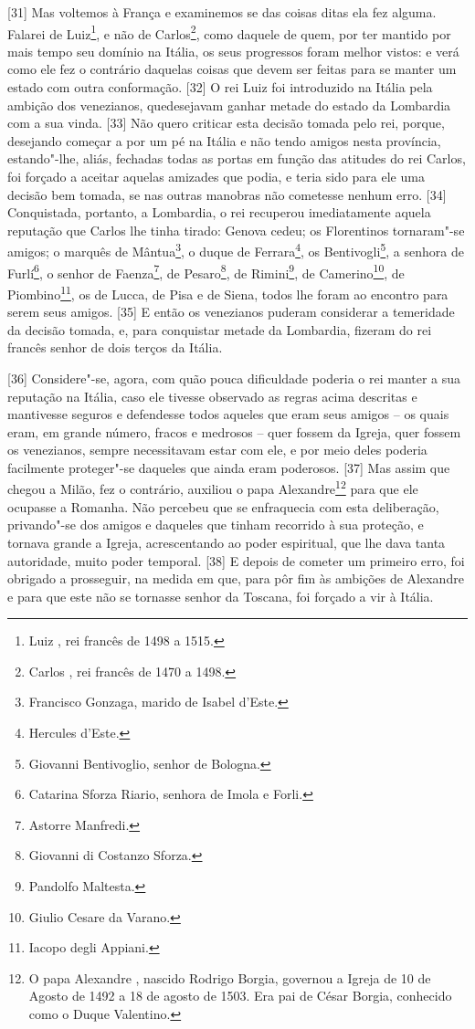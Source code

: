 {[}31{]} Mas voltemos à França e examinemos se das coisas ditas ela fez
alguma. Falarei de Luiz\footnote{Luiz , rei francês de 1498 a 1515.},
e não de Carlos\footnote{Carlos , rei francês de 1470 a 1498.}, como
daquele de quem, por ter mantido por mais tempo seu domínio na Itália,
os seus progressos foram melhor vistos: e verá como ele fez o contrário
daquelas coisas que devem ser feitas para se manter um estado com outra
conformação. {[}32{]} O rei Luiz foi introduzido na Itália pela ambição
dos venezianos, quedesejavam ganhar metade do estado da Lombardia com a
sua vinda. {[}33{]} Não quero criticar esta decisão tomada pelo rei,
porque, desejando começar a por um pé na Itália e não tendo amigos nesta
província, estando"-lhe, aliás, fechadas todas as portas em função das
atitudes do rei Carlos, foi forçado a aceitar aquelas amizades que
podia, e teria sido para ele uma decisão bem tomada, se nas outras
manobras não cometesse nenhum erro. {[}34{]} Conquistada, portanto, a
Lombardia, o rei recuperou imediatamente aquela reputação que Carlos lhe
tinha tirado: Genova cedeu; os Florentinos tornaram"-se amigos; o marquês
de Mântua\footnote{Francisco Gonzaga, marido de Isabel d'Este.}, o duque
de Ferrara\footnote{Hercules  d'Este.}, os Bentivogli\footnote{Giovanni
  Bentivoglio, senhor de Bologna.}, a senhora de Furlí\footnote{Catarina
  Sforza Riario, senhora de Imola e Forli.}, o senhor de
Faenza\footnote{Astorre Manfredi.}, de Pesaro\footnote{Giovanni di
  Costanzo Sforza.}, de Rimini\footnote{Pandolfo Maltesta.}, de
Camerino\footnote{Giulio Cesare da Varano.}, de Piombino\footnote{Iacopo
  degli Appiani.}, os de Lucca, de Pisa e de Siena, todos lhe foram ao
encontro para serem seus amigos. {[}35{]} E então os venezianos puderam
considerar a temeridade da decisão tomada, e, para conquistar metade da
Lombardia, fizeram do rei francês senhor de dois terços da Itália.

{[}36{]} Considere"-se, agora, com quão pouca dificuldade poderia o rei
manter a sua reputação na Itália, caso ele tivesse observado as regras
acima descritas e mantivesse seguros e defendesse todos aqueles que eram
seus amigos -- os quais eram, em grande número, fracos e medrosos --
quer fossem da Igreja, quer fossem os venezianos, sempre necessitavam
estar com ele, e por meio deles poderia facilmente proteger"-se daqueles
que ainda eram poderosos. {[}37{]} Mas assim que chegou a Milão, fez o
contrário, auxiliou o papa Alexandre\footnote{O papa Alexandre ,
  nascido Rodrigo Borgia, governou a Igreja de 10 de Agosto de 1492 a 18
  de agosto de 1503. Era pai de César Borgia, conhecido como o Duque
  Valentino.} para que ele ocupasse a Romanha. Não percebeu que se
enfraquecia com esta deliberação, privando"-se dos amigos e daqueles que
tinham recorrido à sua proteção, e tornava grande a Igreja,
acrescentando ao poder espiritual, que lhe dava tanta autoridade, muito
poder temporal. {[}38{]} E depois de cometer um primeiro erro, foi
obrigado a prosseguir, na medida em que, para pôr fim às ambições de
Alexandre e para que este não se tornasse senhor da Toscana, foi forçado
a vir à Itália.

